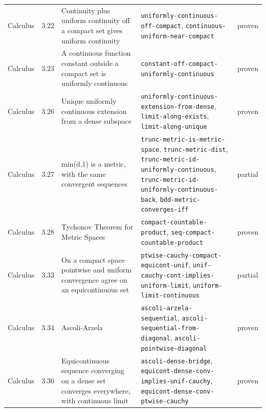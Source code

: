 \begin{longtable}{@{}ll>{\raggedright\arraybackslash}p{4.2cm}>{\raggedright\arraybackslash}p{4.2cm}l@{}}
Calculus & 3.22 & Continuity plus uniform continuity off a compact set gives uniform continuity & \texttt{uniformly-\allowbreak{}continuous-\allowbreak{}off-\allowbreak{}compact}, \texttt{continuous-\allowbreak{}uniform-\allowbreak{}near-\allowbreak{}compact} & proven \\
Calculus & 3.23 & A continuous function constant outside a compact set is uniformly continuous & \texttt{constant-\allowbreak{}off-\allowbreak{}compact-\allowbreak{}uniformly-\allowbreak{}continuous} & proven \\
Calculus & 3.26 & Unique uniformly continuous extension from a dense subspace & \texttt{uniformly-\allowbreak{}continuous-\allowbreak{}extension-\allowbreak{}from-\allowbreak{}dense}, \texttt{limit-\allowbreak{}along-\allowbreak{}exists}, \texttt{limit-\allowbreak{}along-\allowbreak{}unique} & proven \\
Calculus & 3.27 & min(d,1) is a metric, with the same convergent sequences & \texttt{trunc-\allowbreak{}metric-\allowbreak{}is-\allowbreak{}metric-\allowbreak{}space}, \texttt{trunc-\allowbreak{}metric-\allowbreak{}dist}, \texttt{trunc-\allowbreak{}metric-\allowbreak{}id-\allowbreak{}uniformly-\allowbreak{}continuous}, \texttt{trunc-\allowbreak{}metric-\allowbreak{}id-\allowbreak{}uniformly-\allowbreak{}continuous-\allowbreak{}back}, \texttt{bdd-\allowbreak{}metric-\allowbreak{}converges-\allowbreak{}iff} & partial \\
Calculus & 3.28 & Tychonov Theorem for Metric Spaces & \texttt{compact-\allowbreak{}countable-\allowbreak{}product}, \texttt{seq-\allowbreak{}compact-\allowbreak{}countable-\allowbreak{}product} & proven \\
Calculus & 3.33 & On a compact space pointwise and uniform convergence agree on an equicontinuous set & \texttt{ptwise-\allowbreak{}cauchy-\allowbreak{}compact-\allowbreak{}equicont-\allowbreak{}unif}, \texttt{unif-\allowbreak{}cauchy-\allowbreak{}cont-\allowbreak{}implies-\allowbreak{}uniform-\allowbreak{}limit}, \texttt{uniform-\allowbreak{}limit-\allowbreak{}continuous} & partial \\
Calculus & 3.34 & Ascoli-Arzela & \texttt{ascoli-\allowbreak{}arzela-\allowbreak{}sequential}, \texttt{ascoli-\allowbreak{}sequential-\allowbreak{}from-\allowbreak{}diagonal}, \texttt{ascoli-\allowbreak{}pointwise-\allowbreak{}diagonal} & proven \\
Calculus & 3.36 & Equicontinuous sequence converging on a dense set converges everywhere, with continuous limit & \texttt{ascoli-\allowbreak{}dense-\allowbreak{}bridge}, \texttt{equicont-\allowbreak{}dense-\allowbreak{}conv-\allowbreak{}implies-\allowbreak{}unif-\allowbreak{}cauchy}, \texttt{equicont-\allowbreak{}dense-\allowbreak{}conv-\allowbreak{}ptwise-\allowbreak{}cauchy} & proven \\

\end{longtable}
